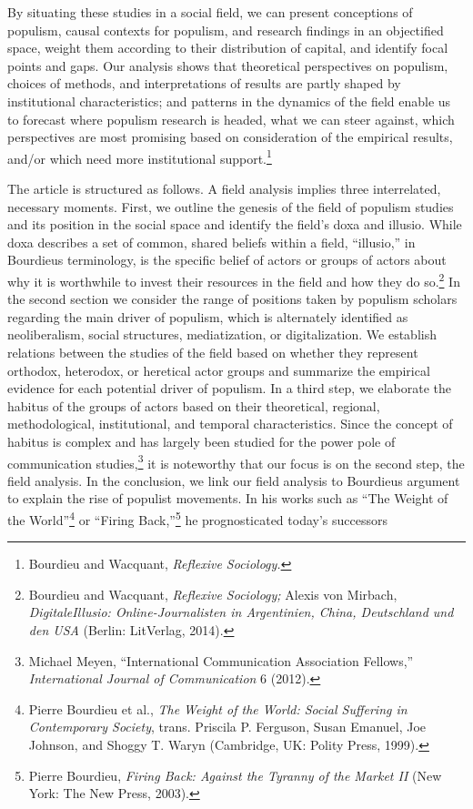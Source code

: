 \documentclass{tufte-handout}
\begin{document}
By situating these studies in a social field, we can present conceptions
of populism, causal contexts for populism, and research findings in an
objectified space, weight them according to their distribution of
capital, and identify focal points and gaps. Our analysis shows that
theoretical perspectives on populism, choices of methods, and
interpretations of results are partly shaped by institutional
characteristics; and patterns in the dynamics of the field enable us to
forecast where populism research is headed, what we can steer against,
which perspectives are most promising based on consideration of the
empirical results, and/or which need more institutional
support.\footnote{Bourdieu and Wacquant, \emph{Reflexive Sociology.}}

The article is structured as follows. A field analysis implies three
interrelated, necessary moments. First, we outline the genesis of the
field of populism studies and its position in the social space and
identify the field's doxa and illusio. While doxa describes a set of
common, shared beliefs within a field, ``illusio,'' in
Bourdieu\textquotesingle s terminology, is the specific belief of actors
or groups of actors about why it is worthwhile to invest their resources
in the field and how they do so.\footnote{Bourdieu and Wacquant,
  \emph{Reflexive Sociology;} Alexis von Mirbach, \emph{DigitaleIllusio:
  Online-Journalisten in Argentinien, China, Deutschland und den USA}
  (Berlin: LitVerlag, 2014).} In the second section we consider the
range of positions taken by populism scholars regarding the main driver
of populism, which is alternately identified as neoliberalism, social
structures, mediatization, or digitalization. We establish relations
between the studies of the field based on whether they represent
orthodox, heterodox, or heretical actor groups and summarize the
empirical evidence for each potential driver of populism. In a third
step, we elaborate the habitus of the groups of actors based on their
theoretical, regional, methodological, institutional, and temporal
characteristics. Since the concept of habitus is complex and has largely
been studied for the power pole of communication studies,\footnote{Michael
  Meyen, ``International Communication Association Fellows,''
  \emph{International Journal of Communication} 6 (2012).} it is
noteworthy that our focus is on the second step, the field analysis. In
the conclusion, we link our field analysis to Bourdieu\textquotesingle s
argument to explain the rise of populist movements. In his works such as
``The Weight of the World''\footnote{Pierre Bourdieu et al., \emph{The
  Weight of the World: Social Suffering in Contemporary Society}, trans.
  Priscila P. Ferguson, Susan Emanuel, Joe Johnson, and Shoggy T. Waryn
  (Cambridge, UK: Polity Press, 1999).} or ``Firing Back,''\footnote{Pierre
  Bourdieu, \emph{Firing Back: Against the Tyranny of the Market II}
  (New York: The New Press, 2003).} he prognosticated today's successors
\end{document}
